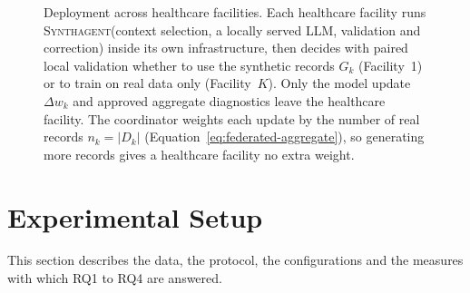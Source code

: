 \documentclass[conference]{IEEEtran}
\newcommand{\system}{\textsc{Synthagent}\xspace}
\begin{document}
\begin{figure}[t]
\centering
\begin{minipage}[c]{0.6\textwidth}
\resizebox{\linewidth}{!}{}
\end{minipage}\hfill
\begin{minipage}[c]{0.37\textwidth}
\caption{Deployment across healthcare facilities. Each healthcare facility runs \system (context selection, a locally served LLM, validation and correction) inside its own infrastructure, then decides with paired local validation whether to use the synthetic records $G_k$ (Facility~1) or to train on real data only (Facility~$K$). Only the model update $\Delta w_k$ and approved aggregate diagnostics leave the healthcare facility. The coordinator weights each update by the number of real records $n_k=|D_k|$ (Equation~\eqref{eq:federated-aggregate}), so generating more records gives a healthcare facility no extra weight.}
\label{fig:federated}
\end{minipage}
\end{figure}


\section{Experimental Setup}
\label{sec:setup}
This section describes the data, the protocol, the configurations and the measures with which RQ1 to RQ4 are answered.
\end{document}
